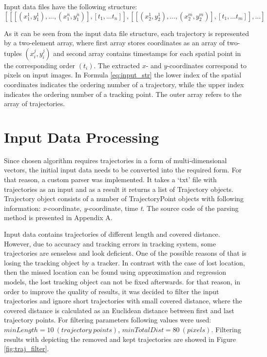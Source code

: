 Input data files have the following structure:
\begin{equation} \label{eq:input_str}
[[[(x_1^1, y_1^1), ..., (x_1^n, y_1^n)], [t_1, ... t_n]], [[(x_2^1, y_2^1), ..., (x_2^m, y_2^m)], [t_1, ... t_m]], ...]
\end{equation}

As it can be seen from the input data file structure, each trajectory is represented by a two-element array, where first array stores coordinates as an array of two-tuples $(x_i^j, y_i^j)$ and second array contains timestamps for each spatial point in the corresponding order $(t_i)$. The extracted $x$- and $y$-coordinates correspond to pixels on input images. In Formula \ref{eq:input_str} the lower index of the spatial coordinates indicates the ordering number of a trajectory, while the upper index indicates the ordering number of a tracking point. The outer array refers to the array of trajectories.

\section{Input Data Processing}
Since chosen algorithm requires trajectories in a form of multi-dimensional vectors, the initial input data needs to be converted into the required form. For that reason, a custom parser was implemented. It takes a ‘txt’ file with trajectories as an input and as a result it returns a list of Trajectory objects. Trajectory object consists of a number of TrajectoryPoint objects with following information: \textit{x}-coordinate, \textit{y}-coordinate, time \textit{t}. The source code of the parsing method is presented in Appendix A.

Input data contains trajectories of different length and covered distance. However, due to accuracy and tracking errors in tracking system, some trajectories are senseless and look deficient. One of the possible reasons of that is losing the tracking object by a tracker. In contrast with the case of lost location, then the missed location can be found using approximation and regression models, the lost tracking object can not be fixed afterwards. for that reason, in order to improve the quality of results, it was decided to filter the input trajectories and ignore short trajectories with small covered distance, where the covered distance is calculated as an Euclidean distance between first and last trajectory points. For filtering parameters following values were used: $minLength = 10\ (trajectory\ points)$, $minTotalDist = 80\ (pixels)$. Filtering results with depicting the removed and kept trajectories are showed in Figure \ref{fig:traj_filter}.

